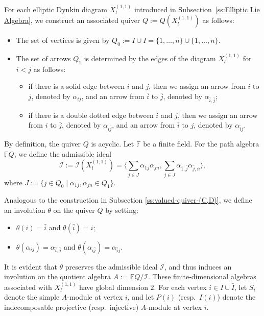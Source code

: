 \documentclass[12pt,reqno]{amsart}
\numberwithin{equation}{section}
\begin{document}
	For each elliptic Dynkin diagram $X_l^{(1,1)}$ introduced in Subsection~\ref{ss:Elliptic Lie Algebra}, we construct an associated quiver $Q := Q(X_l^{(1,1)})$ as follows:
	\begin{itemize}
		\item The set of vertices is given by $Q_0:=I\cup \bar I=\{1,\ldots, n\}\cup\{\bar 1,\ldots,\bar n\}$.
		\item The set of arrows $Q_1$ is determined by the edges of the diagram $X_l^{(1,1)}$ for $i<j$ as follows:
		\begin{itemize}
			\item if there is a solid edge between $i$ and $j$, then we assign an arrow from $i$ to $j$, denoted by $\alpha_{ij}$, and an arrow from $\bar i$ to $\bar j$, denoted by $\alpha_{\bar i,\bar j}$;
			\item if there is a double dotted edge between $i$ and $j$, then we assign an arrow from $i$ to $\bar j$, denoted by $\alpha_{i\bar j}$, and an arrow from $\bar i$ to $j$, denoted by $\alpha_{\bar i j}$.
		\end{itemize}
	\end{itemize}
	By definition, the quiver $Q$ is acyclic. Let $\mathbb{F}$ be a finite field. For the path algebra $\mathbb{F}Q$, we define the admissible ideal
	\[
	\mathcal{I}:=\mathcal{I}(X_l^{(1,1)})=\Big\langle \sum_{j\in 
		J}\alpha_{1j}\alpha_{jn},
	\sum_{j\in J}\alpha_{\bar 1,\bar j}\alpha_{\bar j,\bar n} \Big\rangle,
	\]
	where $J:=\{j\in Q_0\mid \alpha_{1j},\alpha_{jn}\in Q_1\}$.
	
	Analogous to the construction in Subsection \ref{ss:valued-quiver-(C,D)}, we  define an involution $\theta$ on the quiver $Q$ by setting:
	\begin{itemize}
		\item $\theta(i)=\bar{i}$ and $\theta(\bar{i})=i$;
		\item $\theta(\alpha_{ij})=\alpha_{\bar{i},\bar{j}}$ and $\theta(\alpha_{i\bar{j}})=\alpha_{\bar{i}j}$.
	\end{itemize}
	It is evident that $\theta$ preserves the admissible ideal $\mathcal{I}$, and thus induces an involution on the quotient algebra $A:=\mathbb{F}Q/\mathcal{I}$. These finite-dimensional algebras associated with $X_l^{(1,1)}$ have global dimension $2$. For each vertex $i\in I\cup \bar I$, let $S_i$ denote the simple $A$-module at vertex $i$, and let $P(i)$ (resp.~$I(i)$) denote the indecomposable projective (resp.~injective) $A$-module at vertex $i$.
	
\end{document}
